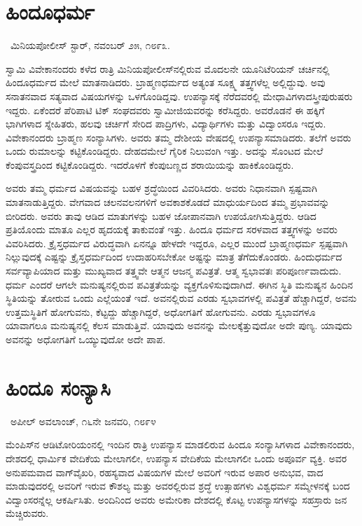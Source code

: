 \section*{ಹಿಂದೂಧರ್ಮ}

~\hfill{\fontsize{11pt}{13.75pt}\selectfont ಮಿನಿಯಪೋಲೀಸ್ ಸ್ಟಾರ್, ನವಂಬರ್ ೨೫, ೧೮೯೩.}

 ಸ್ವಾಮಿ ವಿವೇಕಾನಂದರು ಕಳೆದ ರಾತ್ರಿ ಮಿನಿಯಪೋಲೀಸ್‍ನಲ್ಲಿರುವ ಮೊದಲನೇ ಯೂನಿಟೆರಿಯನ್ ಚರ್ಚಿನಲ್ಲಿ ಹಿಂದೂಧರ್ಮದ ಮೇಲೆ ಮಾತನಾಡಿದರು. ಬ್ರಾಹ್ಮಣಧರ್ಮದ ಅತ್ಯಂತ ಸೂಕ್ಷ್ಮ ತತ್ತ್ವಗಳೆಲ್ಲ ಅಲ್ಲಿದ್ದುವು. ಅವು ಸನಾತನವಾದ ಸತ್ಯವಾದ ವಿಷಯಗಳನ್ನು ಒಳಗೊಂಡಿದ್ದವು. ಉಪನ್ಯಾಸಕ್ಕೆ ನೆರೆದವರಲ್ಲಿ ಮೇಧಾವಿಗಳಾದ\break ಸ್ತ್ರೀಪುರುಷರು ಇದ್ದರು. ಏಕೆಂದರೆ ಪೆರಿಪಾಟಿ ಟಿಕ್ ಸಂಘದವರು ಸ್ವಾಮೀಜಿಯವರನ್ನು ಕರೆಸಿದ್ದರು. ಅವರೊಡನೆ ಈ ಹಕ್ಕಿಗೆ ಭಾಗಿಗಳಾದ ಸ್ನೇಹಿತರು, ಹಲವು ಚರ್ಚಿಗೆ ಸೇರಿದ ಪಾದ್ರಿಗಳು, ವಿದ್ಯಾರ್ಥಿಗಳು ಮತ್ತು ವಿದ್ವಾಂಸರೂ ಇದ್ದರು. ವಿವೇಕಾನಂದರು ಬ್ರಾಹ್ಮಣ ಸಂನ್ಯಾಸಿಗಳು. ಅವರು ತಮ್ಮ ದೇಶೀಯ ವೇಷದಲ್ಲಿ ಉಪನ್ಯಾಸಮಾಡಿದರು. ತಲೆಗೆ ಅವರು ಒಂದು ರುಮಾಲನ್ನು ಕಟ್ಟಿಕೊಂಡಿದ್ದರು. ದೇಹದಮೇಲೆ ಗೈರಿಕ ನಿಲುವಂಗಿ ಇತ್ತು. ಅದನ್ನು ಸೊಂಟದ ಮೇಲೆ ಕೆಂಪುವಸ್ತ್ರದಿಂದ ಕಟ್ಟಿಕೊಂಡಿದ್ದರು. ಇದರೊಳಗೆ ಕೆಂಪುಬಣ್ಣದ ಶರಾಯಿಯನ್ನು ಹಾಕಿಕೊಂಡಿದ್ದರು. 

 ಅವರು ತಮ್ಮ ಧರ್ಮದ ವಿಷಯವನ್ನು ಬಹಳ ಶ್ರದ್ಧೆಯಿಂದ ವಿವರಿಸಿದರು. ಅವರು ನಿಧಾನವಾಗಿ ಸ್ಪಷ್ಟವಾಗಿ ಮಾತನಾಡುತ್ತಿದ್ದರು. ವೇಗವಾದ ಚಲನವಲನಗಳಿಗೆ ಅವಕಾಶಕೊಡದೆ ಮಾಧುರ್ಯದಿಂದ ತಮ್ಮ ಪ್ರಭಾವವನ್ನು ಬೀರಿದರು. ಅವರು ತಾವು ಆಡಿದ ಮಾತುಗಳನ್ನು ಬಹಳ ಜೋಪಾನವಾಗಿ ಉಪಯೋಗಿಸುತ್ತಿದ್ದರು. ಆಡಿದ ಪ್ರತಿಯೊಂದು ಮಾತೂ ಎಲ್ಲರ ಹೃದಯಕ್ಕೆ ತಾಕುವಂತೆ ಇತ್ತು. ಹಿಂದೂ ಧರ್ಮದ ಸರಳವಾದ ತತ್ತ್ವಗಳನ್ನು ಅವರು ವಿವರಿಸಿದರು. ಕ್ರೈಸ್ತಧರ್ಮದ ವಿರುದ್ಧವಾಗಿ ಏನನ್ನೂ ಹೇಳದೇ ಇದ್ದರೂ, ಎಲ್ಲರ ಮುಂದೆ ಬ್ರಾಹ್ಮಣಧರ್ಮ ಸ್ಪಷ್ಟವಾಗಿ ನಿಲ್ಲುವುದಕ್ಕೆ ಎಷ್ಟನ್ನು ಕ್ರೈಸ್ತಧರ್ಮದಿಂದ ಉದಾಹರಿಸಬೇಕೋ ಅಷ್ಟನ್ನು ಮಾತ್ರ ತೆಗೆದುಕೊಂಡರು. ಹಿಂದುಧರ್ಮದ ಸರ್ವವ್ಯಾಪಿಯಾದ ಮತ್ತು ಮುಖ್ಯವಾದ ತತ್ತ್ವವೇ ಆತ್ಮನ ಆಜನ್ಮ ಪವಿತ್ರತೆ. ಆತ್ಮ ಸ್ವಭಾವತಃ ಪರಿಪೂರ್ಣವಾದುದು. ಧರ್ಮ ಎಂದರೆ ಆಗಲೇ ಮನುಷ್ಯನಲ್ಲಿರುವ ಪವಿತ್ರತೆಯನ್ನು ವ್ಯಕ್ತಗೊಳಿಸುವುದಾಗಿದೆ. ಈಗಿನ ಸ್ಥಿತಿ ಮನುಷ್ಯನ ಹಿಂದಿನ ಸ್ಥಿತಿಯನ್ನು ತೋರುವ ಒಂದು ಎಲ್ಲೆಯಂತೆ ಇದೆ. ಅವನಲ್ಲಿರುವ ಎರಡು ಸ್ವಭಾವಗಳಲ್ಲಿ ಪವಿತ್ರತೆ ಹೆಚ್ಚಾಗಿದ್ದರೆ, ಅವನು ಉತ್ತಮಸ್ಥಿತಿಗೆ ಹೋಗುವನು, ಕೆಟ್ಟದ್ದು ಹೆಚ್ಚಾಗಿದ್ದರೆ, ಅಧೋಗತಿಗೆ ಹೋಗುವನು. ಎರಡು ಸ್ವಭಾವಗಳೂ ಯಾವಾಗಲೂ ಮನುಷ್ಯನಲ್ಲಿ ಕೆಲಸ ಮಾಡುತ್ತಿವೆ. ಯಾವುದು ಅವನನ್ನು ಮೇಲಕ್ಕೆತ್ತುವುದೋ ಅದೇ ಪುಣ್ಯ. ಯಾವುದು ಅವನನ್ನು ಅಧೋಗತಿಗೆ ಒಯ್ಯುವುದೋ ಅದೇ ಪಾಪ.


\section*{ಹಿಂದೂ ಸಂನ್ಯಾಸಿ}

~\hfill{\fontsize{11pt}{13.75pt}\selectfont ಅಪೀಲ್ ಅವಲಾಂಚ್, ೧೬ನೇ ಜನವರಿ, ೧೮೯೪}

 ಮೆಂಪಿಸ್‍ನ ಆಡಿಟೋರಿಯಂನಲ್ಲಿ ಇಂದಿನ ರಾತ್ರಿ ಉಪನ್ಯಾಸ ಮಾಡಲಿರುವ ಹಿಂದೂ ಸಂನ್ಯಾಸಿಗಳಾದ ವಿವೇಕಾನಂದರು, ದೇಶದಲ್ಲಿ ಧಾರ್ಮಿಕ ವೇದಿಕೆಯ ಮೇಲಾಗಲೀ, ಉಪನ್ಯಾಸ ವೇದಿಕೆಯ ಮೇಲಾಗಲೀ ಒಂದು ಅಪೂರ್ವ ವ್ಯಕ್ತಿ. ಅವರ ಅನುಪಮವಾದ ವಾಗ್‍ವೈಖರಿ, ರಹಸ್ಯವಾದ ವಿಷಯಗಳ ಮೇಲೆ ಅವರಿಗೆ ಇರುವ ಅಪಾರ ಅನುಭವ, ವಾದ ಮಾಡುವುದರಲ್ಲಿ ಅವರಿಗೆ ಇರುವ ಕೌಶಲ್ಯ ಮತ್ತು ಅವರಲ್ಲಿರುವ ಶ್ರದ್ಧೆ ಉತ್ಸಾಹಗಳು ವಿಶ್ವಧರ್ಮ ಸಮ್ಮೇಳನಕ್ಕೆ ಬಂದ ವಿದ್ವಾಂಸರನ್ನೆಲ್ಲ ಆಕರ್ಷಿಸಿತು. ಅಂದಿನಿಂದ ಅವರು ಅಮೇರಿಕಾ ದೇಶದಲ್ಲಿ ಕೊಟ್ಟ ಉಪನ್ಯಾಸಗಳನ್ನು ಸಹಸ್ರಾರು ಜನ ಮೆಚ್ಚಿರುವರು. 

